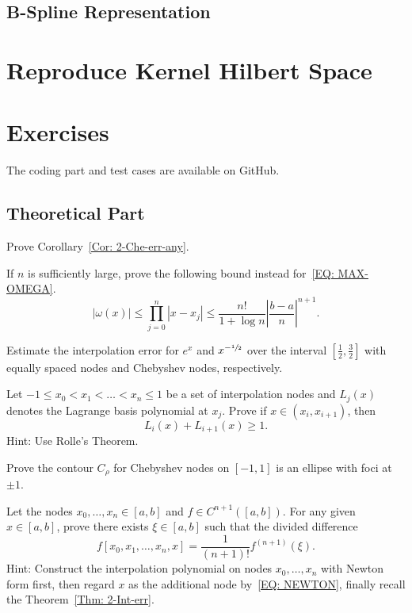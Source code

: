 \subsection{B-Spline Representation}

\section{Reproduce Kernel Hilbert Space}


\section{Exercises}
The coding part and test cases are available on GitHub. 
\subsection{Theoretical Part}
\begin{problem}
    Prove Corollary~\ref{Cor: 2-Che-err-any}.
\end{problem}
\begin{problem}
    If $n$ is sufficiently large, prove the following bound instead for~\eqref{EQ: MAX-OMEGA}.
    \begin{equation}
        |\omega(x)|\le \prod_{j=0}^n |x - x_j| \le \frac{n!}{1 + \log n} \left|\frac{b-a}{n}\right|^{n+1}.
    \end{equation}
\end{problem}
\begin{problem}
\label{Prb: 2-Theo-2}
    Estimate the interpolation error for $e^x$ and $x^{-\sfrac{1}{2}}$ over the interval $[\frac{1}{2}, \frac{3}{2}]$ with equally spaced nodes and Chebyshev nodes, respectively.
\end{problem}
\begin{problem}
    Let $-1\le x_0 < x_1 <\dots < x_n \le 1$ be a set of interpolation nodes and $L_j(x)$ denotes the Lagrange basis polynomial at $x_j$. Prove if $x\in (x_i, x_{i+1})$, then 
    $$L_{i}(x) + L_{i+1}(x) \ge 1.$$
    Hint: Use Rolle's Theorem.
\end{problem}
\begin{problem}
    Prove the contour $C_{\rho}$ for Chebyshev nodes on $[-1, 1]$ is an ellipse with foci at $\pm 1$. 
\end{problem}
\begin{problem}
\label{Prb: 2-Theo-4}
    Let the nodes $x_0, \dots, x_n\in[a,b]$ and $f\in C^{n+1}([a, b])$. For any given $x\in[a, b]$, prove there exists $\xi\in [a, b]$ such that the divided difference $$f[x_0, x_1, \dots, x_n, x] = \frac{1}{(n+1)!}f^{(n+1)}(\xi).$$
    Hint: {Construct the interpolation polynomial on nodes $x_0, \dots, x_n$ with Newton form first, then regard $x$ as the additional node by~\eqref{EQ: NEWTON}, finally recall the Theorem~\ref{Thm: 2-Int-err}.}
\end{problem}

